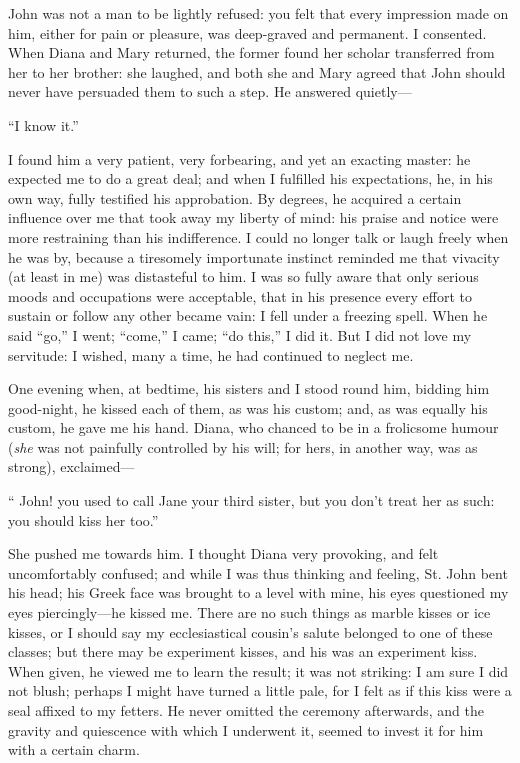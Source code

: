\St{} John was not a man to be lightly refused: you felt that every
impression made on him, either for pain or pleasure, was deep-graved and
permanent. I consented. When Diana and Mary returned, the former found
her scholar transferred from her to her brother: she laughed, and both
she and Mary agreed that \St{} John should never have persuaded them to
such a step. He answered quietly---

\enquote{I know it.}

I found him a very patient, very forbearing, and yet an exacting master:
he expected me to do a great deal; and when I fulfilled his
expectations, he, in his own way, fully testified his approbation. By
degrees, he acquired a certain influence over me that took away my
liberty of mind: his praise and notice were more restraining than his
indifference. I could no longer talk or laugh freely when he was by,
because a tiresomely importunate instinct reminded me that vivacity (at
least in me) was distasteful to him. I was so fully aware that only
serious moods and occupations were acceptable, that in his presence
every effort to sustain or follow any other became vain: I fell under a
freezing spell. When he said \enquote{go,} I went; \enquote{come,} I
came; \enquote{do this,} I did it. But I did not love my servitude: I
wished, many a time, he had continued to neglect me.

One evening when, at bedtime, his sisters and I stood round him, bidding
him good-night, he kissed each of them, as was his custom; and, as was
equally his custom, he gave me his hand. Diana, who chanced to be in a
frolicsome humour (\emph{she} was not painfully controlled by his will;
for hers, in another way, was as strong), exclaimed---

\enquote{\St{} John! you used to call Jane your third sister, but you
don't treat her as such: you should kiss her too.}

She pushed me towards him. I thought Diana very provoking, and felt
uncomfortably confused; and while I was thus thinking and feeling, St.
John bent his head; his Greek face was brought to a level with mine, his
eyes questioned my eyes piercingly---he kissed me. There are no such
things as marble kisses or ice kisses, or I should say my ecclesiastical
cousin's salute belonged to one of these classes; but there may be
experiment kisses, and his was an experiment kiss. When given, he
viewed me to learn the result; it was not striking: I am sure I did not
blush; perhaps I might have turned a little pale, for I felt as if this
kiss were a seal affixed to my fetters. He never omitted the ceremony
afterwards, and the gravity and quiescence with which I underwent it,
seemed to invest it for him with a certain charm.


